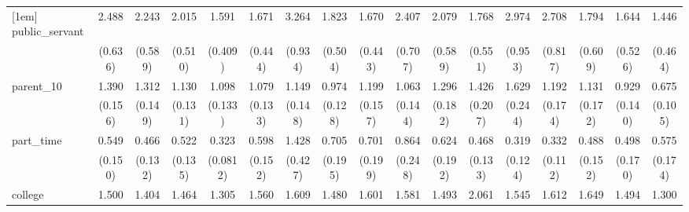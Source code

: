 {\begin{tabular}{l*{16}{c}}
[1em]
public\_servant      &       2.488\sym{***}&       2.243\sym{**} &       2.015\sym{**} &       1.591         &       1.671         &       3.264\sym{***}&       1.823\sym{*}  &       1.670         &       2.407\sym{**} &       2.079\sym{**} &       1.768         &       2.974\sym{***}&       2.708\sym{***}&       1.794         &       1.644         &       1.446         \\
                    &     (0.636)         &     (0.589)         &     (0.510)         &     (0.409)         &     (0.444)         &     (0.934)         &     (0.504)         &     (0.443)         &     (0.707)         &     (0.589)         &     (0.551)         &     (0.953)         &     (0.817)         &     (0.609)         &     (0.526)         &     (0.464)         \\
[1em]
parent\_10           &       1.390\sym{**} &       1.312\sym{*}  &       1.130         &       1.098         &       1.079         &       1.149         &       0.974         &       1.199         &       1.063         &       1.296         &       1.426\sym{*}  &       1.629\sym{**} &       1.192         &       1.131         &       0.929         &       0.675\sym{*}  \\
                    &     (0.156)         &     (0.149)         &     (0.131)         &     (0.133)         &     (0.133)         &     (0.148)         &     (0.128)         &     (0.157)         &     (0.144)         &     (0.182)         &     (0.207)         &     (0.244)         &     (0.174)         &     (0.172)         &     (0.140)         &     (0.105)         \\
[1em]
part\_time           &       0.549\sym{*}  &       0.466\sym{**} &       0.522\sym{*}  &       0.323\sym{***}&       0.598\sym{*}  &       1.428         &       0.705         &       0.701         &       0.864         &       0.624         &       0.468\sym{**} &       0.319\sym{**} &       0.332\sym{**} &       0.488\sym{*}  &       0.498\sym{*}  &       0.575         \\
                    &     (0.150)         &     (0.132)         &     (0.135)         &    (0.0812)         &     (0.152)         &     (0.427)         &     (0.195)         &     (0.199)         &     (0.248)         &     (0.192)         &     (0.133)         &     (0.124)         &     (0.112)         &     (0.152)         &     (0.170)         &     (0.174)         \\
[1em]
college             &       1.500\sym{**} &       1.404\sym{*}  &       1.464\sym{**} &       1.305         &       1.560\sym{**} &       1.609\sym{**} &       1.480\sym{**} &       1.601\sym{**} &       1.581\sym{**} &       1.493\sym{*}  &       2.061\sym{***}&       1.545\sym{*}  &       1.612\sym{**} &       1.649\sym{**} &       1.494\sym{*}  &       1.300         \\

\end{tabular}}
